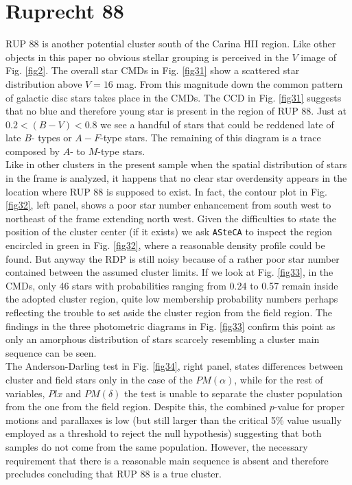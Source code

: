\documentclass{aa}
\begin{document}
\section{Ruprecht 88}

RUP 88 is another potential cluster south of the Carina HII region. Like
other objects in this paper no obvious stellar grouping is perceived in the $V$
image of Fig. \ref{fig2}. The overall star CMDs in Fig. \ref{fig31} show a
scattered star distribution above $V = 16$ mag. From this magnitude down the
common pattern of galactic disc stars takes place in the CMDs. The CCD in Fig.
\ref{fig31} suggests that no blue and therefore young star is present in the
region of RUP 88. Just at $0.2 < (B-V) < 0.8$ we see a handful of stars that
could be reddened late of late $B$- types or $A-F$-type stars. The remaining of
this diagram is a trace composed by $A$- to $M$-type stars.\\

Like in other clusters in the present sample when the spatial distribution of
stars in the frame is analyzed, it happens that no clear star overdensity
appears in the location where RUP 88 is supposed to exist. In fact, the
contour plot in Fig. \ref{fig32}, left panel, shows a poor star number
enhancement from south west to northeast of the frame extending north west.
Given the difficulties to state the position of the cluster center (if it
exists) we ask \texttt{ASteCA} to inspect the region encircled in green in Fig.
\ref{fig32}, where a reasonable density profile could be found. But anyway the
RDP is still noisy because of a rather poor star number contained between the
assumed cluster limits. If we look at Fig. \ref{fig33}, in the CMDs, only 46
stars with probabilities ranging from 0.24 to 0.57 remain inside the adopted
cluster region, quite low membership probability numbers perhaps reflecting the
trouble to set aside the cluster region from the field region. The findings in
the three photometric diagrams in Fig. \ref{fig33} confirm this point as only an
amorphous distribution of stars scarcely resembling a cluster main sequence can
be seen.\\

The Anderson-Darling test in Fig. \ref{fig34}, right panel, states differences
between cluster and field stars only in the case of the $PM(\alpha)$, while
for the rest of variables, $Plx$ and $PM(\delta)$ the test is unable to separate
the cluster population from the one from the field region. Despite this, the
combined $p$-value for proper motions and parallaxes is low (but still larger
than the critical 5\% value usually employed as a threshold to reject the
null hypothesis)
suggesting that both samples do not come from the same population. However, the
necessary requirement that there is a reasonable main sequence is absent and
therefore precludes concluding that RUP 88 is a true cluster.
\end{document}
